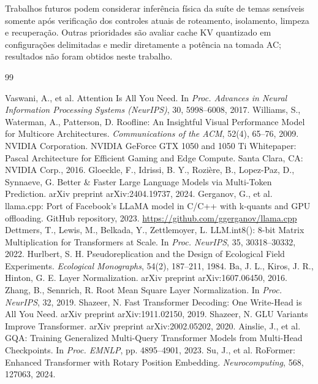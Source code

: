\documentclass[10pt,a4paper,twocolumn]{article}
\begin{document}
Trabalhos futuros podem considerar infer\^encia f\'isica da su\'ite de temas sens\'iveis somente ap\'os verifica\c{c}\~ao dos controles atuais de roteamento, isolamento, limpeza e recupera\c{c}\~ao. Outras prioridades s\~ao avaliar cache KV quantizado em configura\c{c}\~oes delimitadas e medir diretamente a pot\^encia na tomada AC; resultados n\~ao foram obtidos neste trabalho.

\begin{thebibliography}{99}
\begin{singlespace}
\setlength{\itemsep}{0.25em}
 Vaswani, A., et al. Attention Is All You Need. In \emph{Proc. Advances in Neural Information Processing Systems (NeurIPS)}, 30, 5998--6008, 2017.
 Williams, S., Waterman, A., Patterson, D. Roofline: An Insightful Visual Performance Model for Multicore Architectures. \emph{Communications of the ACM}, 52(4), 65--76, 2009.
 NVIDIA Corporation. NVIDIA GeForce GTX 1050 and 1050 Ti Whitepaper: Pascal Architecture for Efficient Gaming and Edge Compute. Santa Clara, CA: NVIDIA Corp., 2016.
 Gloeckle, F., Idrissi, B. Y., Rozi\`ere, B., Lopez-Paz, D., Synnaeve, G. Better \& Faster Large Language Models via Multi-Token Prediction. arXiv preprint arXiv:2404.19737, 2024.
 Gerganov, G., et al. llama.cpp: Port of Facebook's LLaMA model in C/C++ with k-quants and GPU offloading. GitHub repository, 2023. \url{https://github.com/ggerganov/llama.cpp}
 Dettmers, T., Lewis, M., Belkada, Y., Zettlemoyer, L. LLM.int8(): 8-bit Matrix Multiplication for Transformers at Scale. In \emph{Proc. NeurIPS}, 35, 30318--30332, 2022.
 Hurlbert, S. H. Pseudoreplication and the Design of Ecological Field Experiments. \emph{Ecological Monographs}, 54(2), 187--211, 1984.
 Ba, J. L., Kiros, J. R., Hinton, G. E. Layer Normalization. arXiv preprint arXiv:1607.06450, 2016.
 Zhang, B., Sennrich, R. Root Mean Square Layer Normalization. In \emph{Proc. NeurIPS}, 32, 2019.
 Shazeer, N. Fast Transformer Decoding: One Write-Head is All You Need. arXiv preprint arXiv:1911.02150, 2019.
 Shazeer, N. GLU Variants Improve Transformer. arXiv preprint arXiv:2002.05202, 2020.
 Ainslie, J., et al. GQA: Training Generalized Multi-Query Transformer Models from Multi-Head Checkpoints. In \emph{Proc. EMNLP}, pp. 4895--4901, 2023.
 Su, J., et al. RoFormer: Enhanced Transformer with Rotary Position Embedding. \emph{Neurocomputing}, 568, 127063, 2024.

\end{singlespace}
\end{thebibliography}
\end{document}
